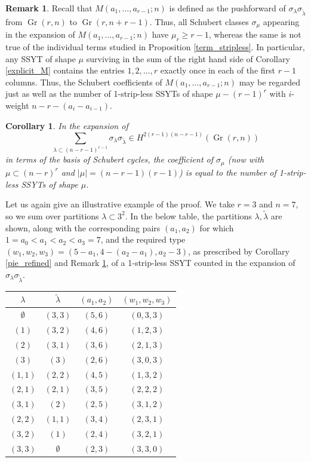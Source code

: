\documentclass[11pt]{article}
\newtheorem{coro}[theo]{Corollary}
\theoremstyle{definition}
\newtheorem{rema}[theo]{Remark}
\numberwithin{equation}{section}
\DeclareMathOperator{\Gr}{Gr}
\begin{document}
\begin{rema}\label{degree_shift}
Recall that $M(a_1,\ldots,a_{r-1};n)$ is defined as the pushforward of $\sigma_\lambda\sigma_{\widetilde{\lambda}}$ from $\Gr(r,n)$ to $\Gr(r,n+r-1)$. Thus, all Schubert classes $\sigma_\mu$ appearing in the expansion of $M(a_1,\ldots,a_{r-1};n)$ have $\mu_r\ge r-1$, whereas the same is not true of the individual terms studied in Proposition \ref{term_stripless}. In particular, any SSYT of shape $\mu$ surviving in the sum of the right hand side of Corollary \ref{explicit_M} contains the entries $1,2,\ldots,r$ exactly once in each of the first $r-1$ columns. Thus, the Schubert coefficients of $M(a_1,\ldots,a_{r-1};n)$ may be regarded just as well as the number of 1-strip-less SSYTs of shape $\mu-(r-1)^r$ with $i$-weight $n-r-(a_{i}-a_{i-1})$.
\end{rema}

\begin{coro}\label{pie_all}
In the expansion of 
\begin{equation*}
\sum_{\lambda\subset(n-r-1)^{r-1}}\sigma_{\lambda}\sigma_{\widetilde{\lambda}}\in H^{2(r-1)(n-r-1)}(\Gr(r,n))
\end{equation*}
in terms of the basis of Schubert cycles, the coefficient of $\sigma_\mu$ (now with $\mu\subset(n-r)^{r}$ and $|\mu|=(n-r-1)(r-1)$) is equal to the number of 1-strip-less SSYTs of shape $\mu$.
\end{coro}

Let us again give an illustrative example of the proof. We take $r=3$ and $n=7$, so we sum over partitions $\lambda\subset 3^2$. In the below table, the partitions $\lambda,\widetilde{\lambda}$ are shown, along with the corresponding pairs $(a_1,a_2)$ for which $1=a_0<a_1<a_2<a_3=7$, and the required type $(w_1,w_2,w_3)=(5-a_1,4-(a_2-a_1),a_2-3)$, as prescribed by Corollary \ref{pie_refined} and Remark \ref{degree_shift}, of a 1-strip-less SSYT counted in the expansion of $\sigma_{\lambda}\sigma_{\widetilde{\lambda}}$. 
\begin{center}
\begin{tabular}{ c | c | c | c }
$\lambda$ & $\widetilde{\lambda}$ & $(a_1,a_2)$ & $(w_1,w_2,w_3)$ \\
\hline
$\emptyset$ & $(3,3)$ & $(5,6)$ & $(0,3,3)$ \\
$(1)$ & $(3,2)$ & $(4,6)$ & $(1,2,3)$\\
$(2)$ & $(3,1)$ & $(3,6)$ & $(2,1,3)$\\
$(3)$ & $(3)$ & $(2,6)$ & $(3,0,3)$\\
$(1,1)$ & $(2,2)$ & $(4,5)$ & $(1,3,2)$\\ 
$(2,1)$ & $(2,1)$ & $(3,5)$ & $(2,2,2)$\\
$(3,1)$ & $(2)$ & $(2,5)$ & $(3,1,2)$\\
$(2,2)$ & $(1,1)$ & $(3,4)$ & $(2,3,1)$\\
$(3,2)$ & $(1)$ & $(2,4)$ & $(3,2,1)$\\
$(3,3)$ & $\emptyset$ & $(2,3)$ & $(3,3,0)$
\end{tabular}
\end{center}
\end{document}
